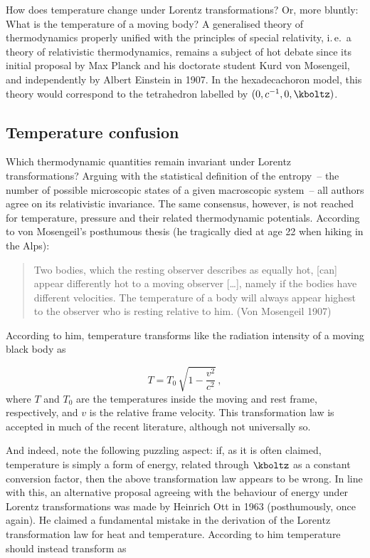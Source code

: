 
\newpage {}
\label{sec:0101}

How does temperature change under Lorentz transformations? Or, more bluntly: What is the temperature of a moving body? A generalised theory of thermodynamics properly unified with the principles of special relativity, i.\,e.\ a theory of relativistic thermodynamics, remains a subject of hot debate since its initial proposal by Max Planck and his doctorate student Kurd von Mosengeil, and independently by Albert Einstein in 1907. In the hexadecachoron model, this theory would correspond to the tetrahedron labelled by $(0,c^{-1},0,\kboltz)$.


\subsection*{Temperature confusion}

Which thermodynamic quantities remain invariant under Lorentz transformations? Arguing with the statistical definition of the entropy~-- the number of possible microscopic states of a given macroscopic system~-- all authors agree on its relativistic invariance. The same consensus, however, is not reached for temperature, pressure and their related thermodynamic potentials. According to von Mosengeil’s posthumous thesis (he tragically died at age 22 when hiking in the Alps):

\begin{quote}
  Two bodies, which the resting observer describes as equally hot, [can] appear differently hot to a moving observer [\dots], namely if the bodies have different velocities. The temperature of a body will always appear highest to the observer who is resting relative to him. (Von Mosengeil 1907)
\end{quote}
%
According to him, temperature transforms like the radiation intensity of a moving black body as

\begin{equation*}\label{reltemplower}
  T = T_0\,\sqrt{1-\frac{v^2}{c^2}}\,,
\end{equation*}
%
where $T$ and $T_0$ are the temperatures inside the moving and rest frame, respectively, and $v$ is the relative frame velocity. This transformation law is accepted in much of the recent literature, although not universally so.

And indeed, note the following puzzling aspect: if, as it is often claimed, temperature is simply a form of energy, related through $\kboltz$ as a constant conversion factor, then the above transformation law appears to be wrong. In line with this, an alternative proposal agreeing with the behaviour of energy under Lorentz transformations was made by Heinrich Ott in 1963 (posthumously, once again). He claimed a fundamental mistake in the derivation of the Lorentz transformation law for heat and temperature. According to him temperature should instead transform as

